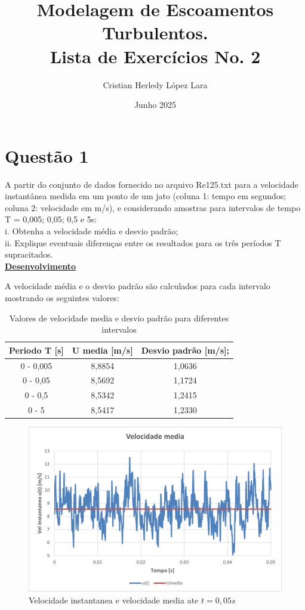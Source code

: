 \documentclass[12pt]{article}
\title{\textbf{Modelagem de Escoamentos Turbulentos. \\Lista de Exercícios No. 2}}
\author{Cristian Herledy López Lara}
\date{Junho 2025}
\begin{document}
	
\maketitle


\section*{Questão 1}

A partir do conjunto de dados fornecido no arquivo Re125.txt para a velocidade instantânea
medida em um ponto de um jato (coluna 1: tempo em segundos; coluna 2: velocidade em
m/s), e considerando amostras para intervalos de tempo T = 0,005; 0,05; 0,5 e 5s:\\
i. Obtenha a velocidade média e desvio padrão;\\
ii. Explique eventuais diferenças entre os resultados para os três períodos T supracitados.\\


\textbf{\underline{Desenvolvimento}}

A velocidade média e o desvio padrão são calculados para cada intervalo mostrando os seguintes valores:

\begin{table}[h]
	\centering
	\begin{tabular}{|c|c|c|}
		\hline
		Periodo T [s] & U media [m/s] & Desvio padrão [m/s]; \\ \hline
		0 - 0,005   & 8,8854    & 1,0636    \\ \hline
		0 - 0,05   & 8,5692   & 1,1724  \\ \hline
		0 - 0,5    & 8,5342    & 1,2415    \\ \hline
		0 - 5    & 8,5417    & 1,2330   \\ \hline
	\end{tabular}
	\caption{Valores de velocidade media e desvio padrão para diferentes intervalos}
\end{table} 

\begin{figure}[H]
	\centering
	\includegraphics[width=.65\textwidth]{figures/1}
	\caption{Velocidade instantanea e velocidade media ate $t=0,05s$}
\end{figure}
\end{document}
